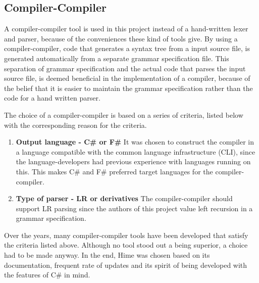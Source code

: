 \subsection{Compiler-Compiler}
\label{sec:compiler_compiler_choice}

A compiler-compiler tool is used in this project instead of a hand-written lexer and parser, because of the conveniences these kind of tools give. By using a compiler-compiler, code that generates a syntax tree from a input source file, is generated automatically from a separate grammar specification file. This separation of grammar specification and the actual code that parses the input source file, is deemed beneficial in the implementation of a compiler, because of the belief that it is easier to maintain the grammar specification rather than the code for a hand written parser.



The choice of a compiler-compiler is based on a series of criteria, listed below with the corresponding reason for the criteria.

\begin{enumerate}
\item \textbf{Output language - C\# or F\#} It was chosen to construct the compiler in a language compatible with the common language infrastructure (CLI), since the language-developers had previous experience with languages running on this. This makes C\# and F\# preferred target languages for the compiler-compiler.

\item \textbf{Type of parser - LR or derivatives} The compiler-compiler should support LR parsing since the authors of this project value left recursion in a grammar specification.\\ 

\end{enumerate}

Over the years, many compiler-compiler tools have been developed that satisfy the criteria listed above. Although no tool stood out a being superior, a choice had to be made anyway. In the end, Hime was chosen based on its documentation, frequent rate of updates and its spirit of being developed with the features of C\# in mind.

